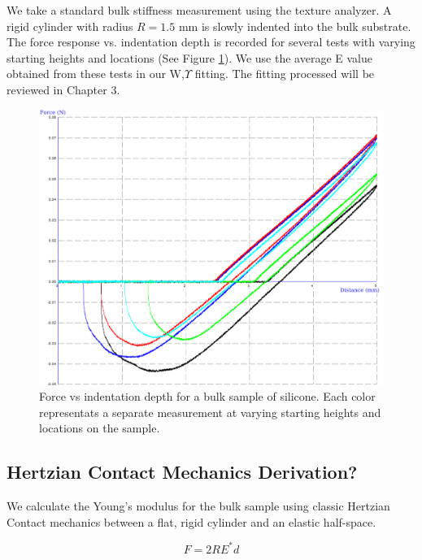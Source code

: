 We take a standard bulk stiffness measurement using the texture analyzer. A rigid cylinder with radius $R = 1.5$ mm is slowly indented into the bulk substrate. The force response vs. indentation depth is recorded for several tests with varying starting heights and locations (See Figure \ref{fig:Bulkstiffness_raw}). We use the average E value obtained from these tests in our W,$ \Upsilon $ fitting. The fitting processed will be reviewed in Chapter 3. 
\begin{figure}[h!]
	\centering
	\includegraphics[width=\linewidth]{Chapters/Figures/190406_DC_1-1RT1-5.png}
	\caption[Bulk Modulus Test]{Force vs indentation depth for a bulk sample of silicone. Each color representats a separate measurement at varying starting heights and locations on the sample.}
	\label{fig:Bulkstiffness_raw}
\end{figure}

\subsection{Hertzian Contact Mechanics Derivation?}
We calculate the Young's modulus for the bulk sample using classic Hertzian Contact mechanics between a flat, rigid cylinder and an elastic half-space.

\begin{equation}
F=2RE^*d
\end{equation}

